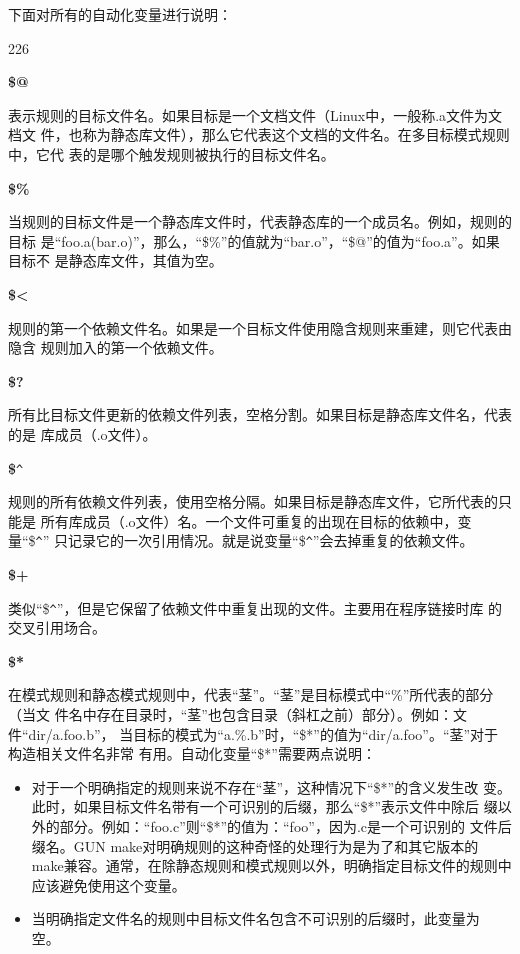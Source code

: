 下面对所有的自动化变量进行说明：
\begin{dinglist}{226}
\itemsep=4pt \parskip=0pt

\item \textbf{\$@}

表示规则的目标文件名。如果目标是一个文档文件（Linux中，一般称.a文件为文档文
件，也称为静态库文件），那么它代表这个文档的文件名。在多目标模式规则中，它代
表的是哪个触发规则被执行的目标文件名。

\item \textbf{\$\%}

当规则的目标文件是一个静态库文件时，代表静态库的一个成员名。例如，规则的目标
是“foo.a(bar.o)”，那么，“\$\%”的值就为“bar.o”，“\$@”的值为“foo.a”。如果目标不
是静态库文件，其值为空。

\item \textbf{\$<}

规则的第一个依赖文件名。如果是一个目标文件使用隐含规则来重建，则它代表由隐含
规则加入的第一个依赖文件。

\item \textbf{\$?}

所有比目标文件更新的依赖文件列表，空格分割。如果目标是静态库文件名，代表的是
库成员（.o文件）。

\item \textbf{\$}\verb"^"

规则的所有依赖文件列表，使用空格分隔。如果目标是静态库文件，它所代表的只能是
所有库成员（.o文件）名。一个文件可重复的出现在目标的依赖中，变量“\$\verb"^"”
只记录它的一次引用情况。就是说变量“\$\verb"^"”会去掉重复的依赖文件。

\item \textbf{\$+}

类似“\$\verb"^"”，但是它保留了依赖文件中重复出现的文件。主要用在程序链接时库
的交叉引用场合。

\item \textbf{\$*}

在模式规则和静态模式规则中，代表“茎”。“茎”是目标模式中“\%”所代表的部分（当文
件名中存在目录时，“茎”也包含目录（斜杠之前）部分）。例如：文件“dir/a.foo.b”，
当目标的模式为“a.\%.b”时，“\$*”的值为“dir/a.foo”。“茎”对于构造相关文件名非常
有用。自动化变量“\$*”需要两点说明：

\begin{itemize}
\itemsep=0pt \parskip=2pt
  \item 对于一个明确指定的规则来说不存在“茎”，这种情况下“\$*”的含义发生改
      变。此时，如果目标文件名带有一个可识别的后缀，那么“\$*”表示文件中除后
      缀以外的部分。例如：“foo.c”则“\$*”的值为：“foo”，因为.c是一个可识别的
      文件后缀名。GUN make对明确规则的这种奇怪的处理行为是为了和其它版本的
      make兼容。通常，在除静态规则和模式规则以外，明确指定目标文件的规则中
      应该避免使用这个变量。
  \item 当明确指定文件名的规则中目标文件名包含不可识别的后缀时，此变量为
      空。
\end{itemize}

\end{dinglist}

